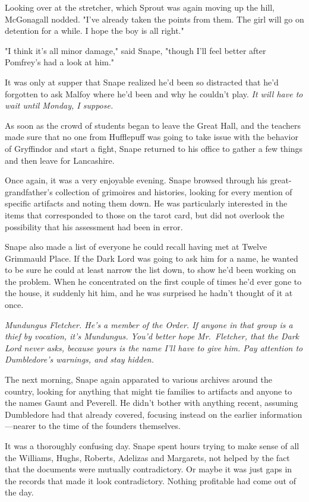 Looking over at the stretcher, which Sprout was again moving up the hill, McGonagall nodded. "I've already taken the points from them. The girl will go on detention for a while. I hope the boy is all right."

"I think it's all minor damage," said Snape, "though I'll feel better after Pomfrey's had a look at him."

It was only at supper that Snape realized he'd been so distracted that he'd forgotten to ask Malfoy where he'd been and why he couldn't play. \emph{It will have to wait until Monday, I suppose.}

As soon as the crowd of students began to leave the Great Hall, and the teachers made sure that no one from Hufflepuff was going to take issue with the behavior of Gryffindor and start a fight, Snape returned to his office to gather a few things and then leave for Lancashire.

Once again, it was a very enjoyable evening. Snape browsed through his great-grandfather's collection of grimoires and histories, looking for every mention of specific artifacts and noting them down. He was particularly interested in the items that corresponded to those on the tarot card, but did not overlook the possibility that his assessment had been in error.

Snape also made a list of everyone he could recall having met at Twelve Grimmauld Place. If the Dark Lord was going to ask him for a name, he wanted to be sure he could at least narrow the list down, to show he'd been working on the problem. When he concentrated on the first couple of times he'd ever gone to the house, it suddenly hit him, and he was surprised he hadn't thought of it at once.

\emph{Mundungus Fletcher. He's a member of the Order. If anyone in that group is a thief by vocation, it's Mundungus. You'd better hope Mr.~Fletcher, that the Dark Lord never asks, because yours is the name I'll have to give him. Pay attention to Dumbledore's warnings, and stay hidden.}

The next morning, Snape again apparated to various archives around the country, looking for anything that might tie families to artifacts and anyone to the names Gaunt and Peverell. He didn't bother with anything recent, assuming Dumbledore had that already covered, focusing instead on the earlier information—nearer to the time of the founders themselves.

It was a thoroughly confusing day. Snape spent hours trying to make sense of all the Williams, Hughs, Roberts, Adelizas and Margarets, not helped by the fact that the documents were mutually contradictory. Or maybe it was just gaps in the records that made it look contradictory. Nothing profitable had come out of the day.

